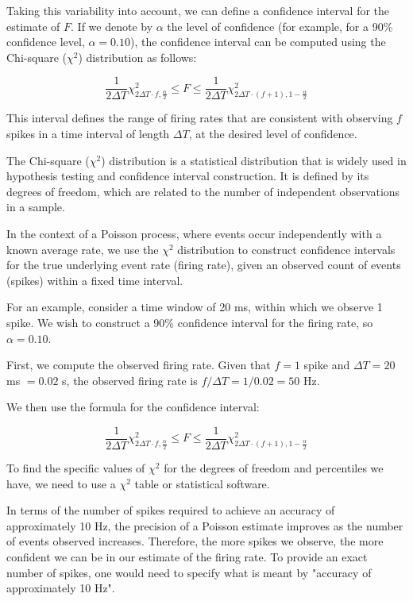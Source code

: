 Taking this variability into account, we can define a confidence interval for the estimate of $F$. If we denote by $\alpha$ the level of confidence (for example, for a 90\% confidence level, $\alpha = 0.10$), the confidence interval can be computed using the Chi-square ($\chi^2$) distribution as follows:

\begin{equation}
\frac{1}{2\Delta T} \chi^{2}_{2\Delta T \cdot f, \frac{\alpha}{2}} \leq F \leq \frac{1}{2\Delta T} \chi^{2}_{2\Delta T \cdot (f+1), 1-\frac{\alpha}{2}}
\end{equation}

This interval defines the range of firing rates that are consistent with observing $f$ spikes in a time interval of length $\Delta T$, at the desired level of confidence.




The Chi-square ($\chi^2$) distribution is a statistical distribution that is widely used in hypothesis testing and confidence interval construction. It is defined by its degrees of freedom, which are related to the number of independent observations in a sample.

In the context of a Poisson process, where events occur independently with a known average rate, we use the $\chi^2$ distribution to construct confidence intervals for the true underlying event rate (firing rate), given an observed count of events (spikes) within a fixed time interval.

For an example, consider a time window of 20 ms, within which we observe 1 spike. We wish to construct a 90\% confidence interval for the firing rate, so $\alpha = 0.10$.

First, we compute the observed firing rate. Given that $f = 1$ spike and $\Delta T = 20$ ms $= 0.02$ s, the observed firing rate is $f/\Delta T = 1 / 0.02 = 50$ Hz.

We then use the formula for the confidence interval:

\begin{equation}
\frac{1}{2\Delta T} \chi^{2}_{2\Delta T \cdot f, \frac{\alpha}{2}} \leq F \leq \frac{1}{2\Delta T} \chi^{2}_{2\Delta T \cdot (f+1), 1-\frac{\alpha}{2}}
\end{equation}

To find the specific values of $\chi^2$ for the degrees of freedom and percentiles we have, we need to use a $\chi^2$ table or statistical software.

In terms of the number of spikes required to achieve an accuracy of approximately 10 Hz, the precision of a Poisson estimate improves as the number of events observed increases. Therefore, the more spikes we observe, the more confident we can be in our estimate of the firing rate. To provide an exact number of spikes, one would need to specify what is meant by "accuracy of approximately 10 Hz".




